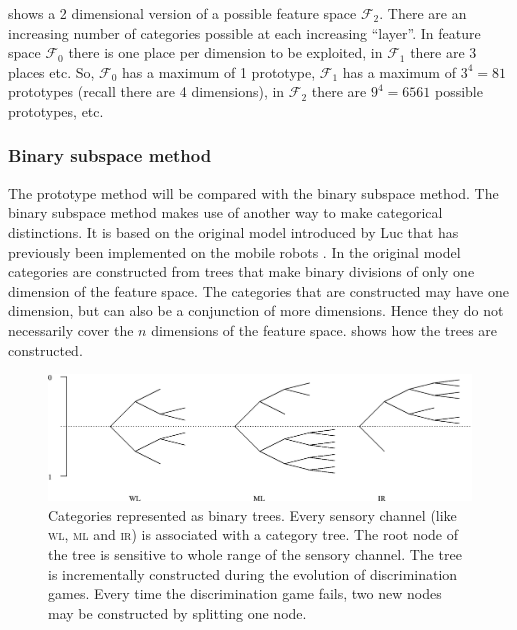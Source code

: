  shows a 2 dimensional version of a possible feature space ${\mathcal F}_2$. There are an increasing number of categories possible at each increasing ``layer''. In feature space ${\mathcal F}_0$ there is one place per dimension to be exploited, in ${\mathcal F}_1$ there are 3 places etc. So, ${\mathcal F}_0$ has a maximum of 1 prototype, ${\mathcal F}_1$ has a maximum of $3^4=81$ prototypes (recall there are 4 dimensions), in ${\mathcal F}_2$ there are $9^4=6561$ possible prototypes, etc. 


\subsubsection{Binary subspace method}\label{s:cm:binary}

The prototype method will be compared with the binary subspace method. The binary subspace method makes use of another way to make categorical distinctions. It is based on the original model introduced by Luc \citet{steels:1996b} that has previously been implemented on the mobile robots \citep{steelsvogt:1997,vogt:1998a}. In the original model categories are constructed from trees that make binary divisions of only one dimension of the feature space. The categories that are constructed may have one dimension, but can also be a conjunction of more dimensions. Hence they do not necessarily cover the $n$ dimensions of the feature space.  shows how the trees are constructed.


\begin{figure}[t]
\centerline{\includegraphics[width=\textwidth]{discr_games/binary_tree.eps}}
\caption{Categories represented as binary trees. Every sensory channel (like {\scshape wl}, {\scshape ml} and {\scshape ir}) is associated with a category tree. The root node of the tree is sensitive to whole range of the sensory channel. The tree is incrementally constructed during the evolution of discrimination games. Every time the discrimination game fails, two new nodes may be constructed by splitting one node.}
\label{f:lg:binarytree}
\end{figure}

